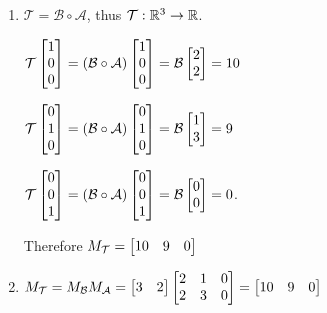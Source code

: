 \begin{exercises}
\begin{problist}

		\begin{solution}

			\begin{enumerate}
				\item 
					$\mathcal T = \mathcal B \circ \mathcal A$, thus
					$\mathcal T : \mathbb{R}^{3}\to \mathbb{R}$.
					
					$\mathcal T \mat{1\\0\\0}=
					(\mathcal B \circ \mathcal A) \mat{1\\0\\0}=
					\mathcal B \mat{2\\2}= 10$

					$\mathcal T \mat{0\\1\\0}= (\mathcal B \circ \mathcal
					A) \mat{0\\1\\0}= \mathcal B \mat{1\\3}= 9$

					$\mathcal T \mat{0\\0\\1}= (\mathcal B \circ \mathcal
					A) \mat{0\\0\\1}= \mathcal B \mat{0\\0}= 0$.
					
					Therefore $M_{\mathcal T}= \mat{10&9&0}$

				\item $M_{\mathcal T}= M_{\mathcal B}M_{\mathcal A}= \mat{3&2}\mat{2&1&0\\2&3&0}=
					\mat{10&9&0}$
			\end{enumerate}
		\end{solution}
	\end{problist}
\end{exercises}
